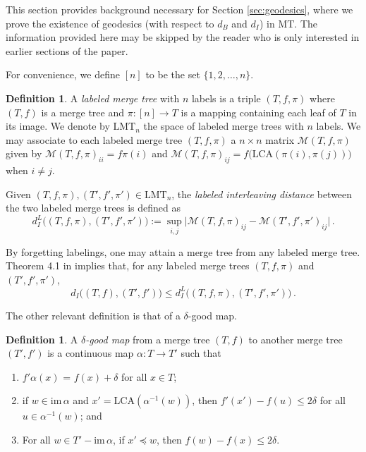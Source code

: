 \documentclass{article}
\theoremstyle{definition}
\newtheorem{definition}[theorem]{Definition}
\newcommand{\im}{\mathrm{im}\,}
\newcommand{\MT}{\mathrm{MT}}
\newcommand{\LCA}{\mathrm{LCA}}
\newcommand{\LMT}{\mathrm{LMT}}
\begin{document}
This section provides background necessary for Section \ref{sec:geodesics}, where we prove the existence of geodesics (with respect to $d_B$ and $d_I$) in $\MT$. The information provided here may be skipped by the reader who is only interested in earlier sections of the paper.

For convenience, we define $[n]$ to be the set $\{1, 2, \ldots,n\}$.

\begin{definition}
    A \emph{labeled merge tree} with $n$ labels is a triple $(T,f,\pi)$ where $(T,f)$ is a merge tree and $\pi:[n] \to T$ is a mapping containing each leaf of $T$ in its image. We denote by $\LMT_n$ the space of labeled merge trees with $n$ labels. We may associate to each labeled merge tree $(T,f,\pi)$ a $n \times n$ matrix $\mathcal{M}(T,f,\pi)$ given by $\mathcal{M}(T,f,\pi)_{ii} = f\pi(i)$ and $\mathcal{M}(T,f,\pi)_{ij} = f\big(\LCA(\pi(i),\pi(j))\big)$ when $i \neq j$.

    Given $(T,f,\pi), (T',f',\pi')\in \LMT_n$, the \emph{labeled interleaving distance} between the two labeled merge trees is defined as
    \begin{equation*}
        d_I^L\big((T,f,\pi), (T',f',\pi')\big) := \sup_{i,j}\big|\mathcal{M}(T,f,\pi)_{ij} - \mathcal{M}(T',f',\pi')_{ij}\big|\,.
    \end{equation*}
\end{definition}

By forgetting labelings, one may attain a merge tree from any labeled merge tree. Theorem 4.1 in \cite{gasparovic2025intrinsic} implies that, for any labeled merge trees $(T,f, \pi)$ and $(T',f',\pi')$,
\begin{equation*}
    d_I\big((T,f),(T',f')\big) \leq d_I^L\big((T,f,\pi), (T',f',\pi')\big)\,.
\end{equation*}

The other relevant definition is that of a $\delta$-good map.
\begin{definition}
    A \emph{$\delta$-good map} from a merge tree $(T,f)$ to another merge tree $(T',f')$ is a continuous map $\alpha:T\to T'$ such that
    \begin{enumerate}
        \item $f'\alpha(x)$ = $f(x) + \delta$ for all $x \in T$;
        \item if $w\in\im\alpha$ and $x' = \LCA(\alpha^{-1}(w))$, then $f'(x') - f(u) \leq 2\delta$ for all $u \in \alpha^{-1}(w)$; and
        \item For all $w \in T' -\im \alpha$, if $x' \preceq w$, then $f(w) - f(x) \leq 2\delta$.
    \end{enumerate}
\end{definition}
\end{document}
